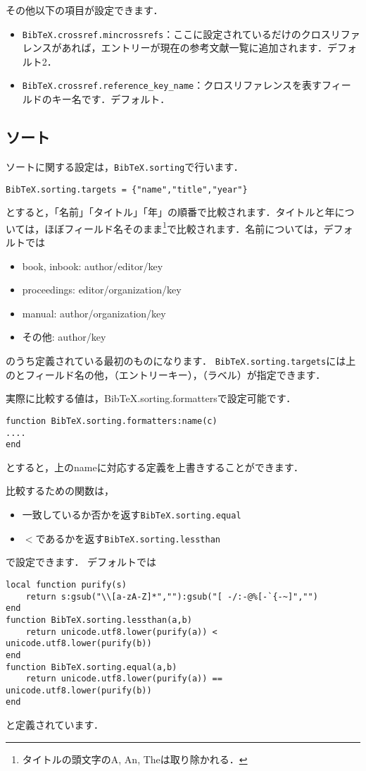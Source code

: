 \documentclass[a4paper]{ltjsarticle}
\newcommand{\luafunc}[1]{\texttt{#1}}
\newcommand*{\luavar}[1]{\texttt{#1}}
\begin{document}
その他以下の項目が設定できます．
\begin{itemize}
\item \luavar{BibTeX.crossref.mincrossrefs}：ここに設定されているだけのクロスリファレンスがあれば，エントリーが現在の参考文献一覧に追加されます．デフォルト2．
\item \luavar{BibTeX.crossref.reference\_key\_name}：クロスリファレンスを表すフィールドのキー名です．デフォルト．
\end{itemize}

\subsection{ソート}
ソートに関する設定は，\luavar{BibTeX.sorting}で行います．
\begin{lstlisting}
BibTeX.sorting.targets = {"name","title","year"}
\end{lstlisting}
とすると，「名前」「タイトル」「年」の順番で比較されます．タイトルと年については，ほぼフィールド名そのまま\footnote{タイトルの頭文字のA, An, Theは取り除かれる．}で比較されます．名前については，デフォルトでは
\begin{itemize}
\item book, inbook: author/editor/key
\item proceedings: editor/organization/key
\item manual: author/organization/key
\item その他: author/key
\end{itemize}
のうち定義されている最初のものになります．
\luavar{BibTeX.sorting.targets}には上のとフィールド名の他，（エントリーキー），（ラベル）が指定できます．

実際に比較する値は，BibTeX.sorting.formattersで設定可能です．
\begin{lstlisting}
function BibTeX.sorting.formatters:name(c)
....
end
\end{lstlisting}
とすると，上のnameに対応する定義を上書きすることができます．

比較するための関数は，
\begin{itemize}
\item 一致しているか否かを返す\luafunc{BibTeX.sorting.equal}
\item $<$であるかを返す\luafunc{BibTeX.sorting.lessthan}
\end{itemize}
で設定できます．
デフォルトでは
\begin{lstlisting}
local function purify(s)
    return s:gsub("\\[a-zA-Z]*",""):gsub("[ -/:-@%[-`{-~]","")
end
function BibTeX.sorting.lessthan(a,b)
    return unicode.utf8.lower(purify(a)) < unicode.utf8.lower(purify(b))
end
function BibTeX.sorting.equal(a,b)
    return unicode.utf8.lower(purify(a)) == unicode.utf8.lower(purify(b))
end
\end{lstlisting}
と定義されています．
\end{document}
